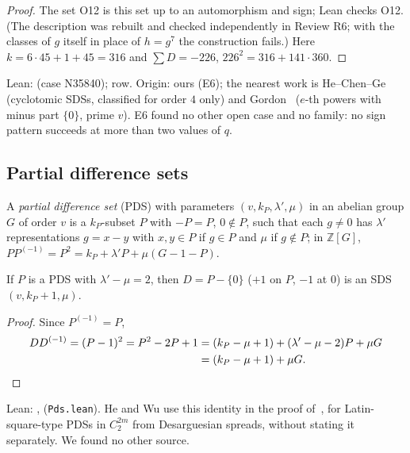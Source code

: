 \begin{proof}
The set O12 is this set up to an automorphism and sign; Lean checks O12. (The description was
rebuilt and checked independently in Review R6; with the classes of $g$ itself in place of
$h = g^7$ the construction fails.) Here $k = 6 \cdot 45 + 1 + 45 = 316$ and
$\sum D = -226$, $226^2 = 316 + 141 \cdot 360$.
\end{proof}

\begin{remark}
Lean:  (case N35840);  row. Origin: ours (E6); the nearest
work is He--Chen--Ge~\cite[\S5]{he-chen-ge} (cyclotomic SDSs, classified for order $4$ only)
and Gordon~\cite[\S3]{gordon} ($e$-th powers with minus part $\{0\}$, prime $v$). E6 found no
other open case and no family: no sign pattern succeeds at more than two values of $q$.
\end{remark}

\subsection{Partial difference sets}

A \emph{partial difference set} (PDS) with parameters $(v, k_P, \lambda', \mu)$ in an abelian
group $G$ of order $v$ is a $k_P$-subset $P$ with $-P = P$, $0 \notin P$, such that each
$g \neq 0$ has $\lambda'$ representations $g = x - y$ with $x, y \in P$ if $g \in P$ and $\mu$
if $g \notin P$; in $\mathbb{Z}[G]$,
$PP^{(-1)} = P^2 = k_P + \lambda' P + \mu(G - 1 - P)$.

\begin{lemma}\label{lem:pds}
If $P$ is a PDS with $\lambda' - \mu = 2$, then $D = P - \{0\}$ ($+1$ on $P$, $-1$ at $0$) is an
SDS $(v, k_P + 1, \mu)$.
\end{lemma}

\begin{proof}
Since $P^{(-1)} = P$,
\begin{align*}
  DD^{(-1)} = (P - 1)^2 = P^2 - 2P + 1
  &= (k_P - \mu + 1) + (\lambda' - \mu - 2)P + \mu G \\
  &= (k_P - \mu + 1) + \mu G. \qedhere
\end{align*}
\end{proof}

\begin{remark}
Lean: ,  (\texttt{Pds.lean}). He and Wu use this
identity in the proof of~\cite[Thm.~5.3]{he-wu}, for Latin-square-type PDSs in $C_2^{2m}$ from
Desarguesian spreads, without stating it separately. We found no other source.
\end{remark}

